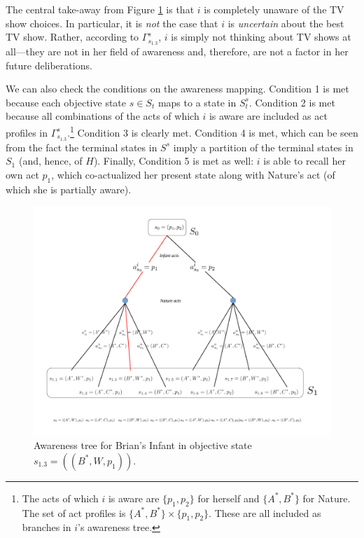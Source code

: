 \documentclass[
11pt,
titlepage,
reqno,
]{article}%
\theoremstyle{definition}
\begin{document}
The central take-away from Figure \ref{Diag: p-02} is that $i$ is completely unaware of the TV show choices.
In particular, it is \textit{not} the case that $i$ is \textit{uncertain} about the best TV show.
Rather, according to $\Gamma^s_{s_{1.3}}$, $i$ is simply not thinking about TV shows at all---they are not in her field of awareness and, therefore, are not a factor in her future deliberations.

We can also check the conditions on the awareness mapping. 
Condition 1 is met because each objective state $s\in S_t$ maps to a state in $S^s_t$.
Condition 2 is met because all combinations of the acts of which $i$ is aware are included as act profiles in $\Gamma^s_{s_{1.3}}$.\footnote
{
	The acts of which $i$ is aware are $\{p_1,p_2\}$ for herself and $\{A^\ast,B^\ast\}$ for Nature. The set of act profiles is  $\{A^\ast,B^\ast\}\times \{p_1,p_2\}$. These are all included as branches in $i$'s awareness tree. 
}
Condition 3 is clearly met. 
Condition 4 is met, which can be seen from the fact the terminal states in $S^s$ imply a partition of the terminal states in $S_1$ (and, hence, of $H$).
Finally, Condition 5 is met as well: $i$ is able to recall her own act $p_1$, which co-actualized her present state along with Nature's act (of which she is partially aware).

\begin{figure}[h!]
	\centering
	\includegraphics*[page=2,trim = 0in 0in 0in 0in,scale=.6]{Awareness_Diagrams_All}
	\caption{Awareness tree for Brian's Infant in objective state $s_{1.3}=((B^\ast,W,p_1)) $.\label{Diag: p-02}}%
\end{figure}
\end{document}
